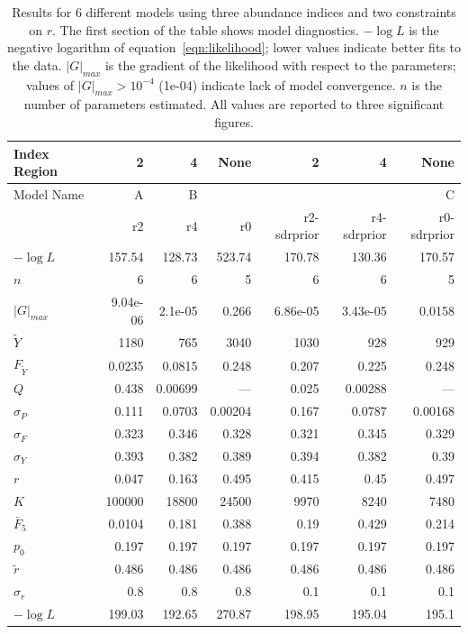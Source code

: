 \documentclass[12pt,letterpaper]{article}
\newcommand\MSY{\widetilde{Y}}
\newcommand\Fmsy{F_{\MSY}}
\begin{document}
\begin{table}
{\small
\caption{Results for 6 different models using three
abundance indices and two constraints on $r$. The first section of the
table shows model diagnostics. $-\log L$ is the negative logarithm of
equation~\ref{eqn:likelihood}; lower values indicate better fits to
the data.
$|G|_{max}$ is the gradient of the likelihood with respect to the
parameters; values of $|G|_{max}>10^{-4}$ (1e-04) indicate lack of model
convergence.
$n$ is the number of parameters estimated.
All values are reported to three significant figures.
}
\label{tab:ests1}
\begin{center}
\begin{tabular}{|l|rrr|rrr|}
\hline
Index Region  &  2& 4& None& 2& 4& None\\
\hline
Model Name & A    & B   &     &     &     & C\\
\hline
\hline
&r2 & r4 & r0 & r2-sdrprior & r4-sdrprior & r0-sdrprior\\
$-\log L$ & 157.54 & 128.73 & 523.74 & 170.78 & 130.36 & 170.57\\
$n$ & 6 & 6 & 5 & 6 & 6 & 5\\
$|G|_{max}$ & 9.04e-06 & 2.1e-05 & 0.266 & 6.86e-05 & 3.43e-05 & 0.0158\\
\hline
$\MSY$ & 1180 & 765 & 3040 & 1030 & 928 & 929\\
$\Fmsy$ & 0.0235 & 0.0815 & 0.248 & 0.207 & 0.225 & 0.248\\
$Q$ & 0.438 & 0.00699 & --- & 0.025 & 0.00288 & ---\\
$\sigma_P$ & 0.111 & 0.0703 & 0.00204 & 0.167 & 0.0787 & 0.00168\\
$\sigma_F$ & 0.323 & 0.346 & 0.328 & 0.321 & 0.345 & 0.329\\
$\sigma_Y$ & 0.393 & 0.382 & 0.389 & 0.394 & 0.382 & 0.39\\
\hline
$r$ & 0.047 & 0.163 & 0.495 & 0.415 & 0.45 & 0.497\\
$K$ & 100000 & 18800 & 24500 & 9970 & 8240 & 7480\\
$\bar{F}_5$ & 0.0104 & 0.181 & 0.388 & 0.19 & 0.429 & 0.214\\
\hline
$p_0$ & 0.197 & 0.197 & 0.197 & 0.197 & 0.197 & 0.197\\
$\tilde{r}$ & 0.486 & 0.486 & 0.486 & 0.486 & 0.486 & 0.486\\
$\sigma_r$ & 0.8 & 0.8 & 0.8 & 0.1 & 0.1 & 0.1\\
\hline
\hline
$-\log L$ & 199.03 & 192.65 & 270.87 & 198.95 & 195.04 & 195.1\\

\end{tabular}
\end{center}}
\end{table}
\end{document}
